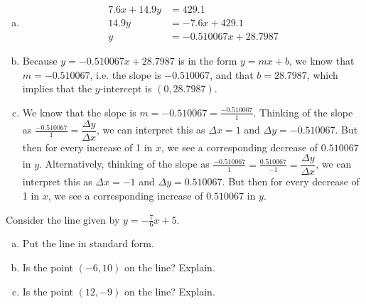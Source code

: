 \documentclass[11pt,letterpaper]{article}
\begin{document}
\sol
\begin{enumerate}[(a)]
\item 
	\[
	\begin{aligned}
	7.6x + 14.9y&= 429.1 \\[0.3cm]
	14.9y&= -7.6x + 429.1 \\[0.3cm]
	y&= -0.510067x + 28.7987
	\end{aligned}
	\] \pspace

\item Because $y= -0.510067x + 28.7987$ is in the form $y= mx + b$, we know that $m= -0.510067$, i.e. the slope is $-0.510067$, and that $b= 28.7987$, which implies that the $y$-intercept is $(0, 28.7987)$. \pspace

\item We know that the slope is $m= -0.510067= \frac{-0.510067}{1}$. Thinking of the slope as $\frac{-0.510067}{1}= \dfrac{\Delta y}{\Delta x}$, we can interpret this as $\Delta x= 1$ and $\Delta y= -0.510067$. But then for every increase of 1 in $x$, we see a corresponding decrease of $0.510067$ in $y$. Alternatively, thinking of the slope as $\frac{-0.510067}{1}= \frac{0.510067}{-1}= \dfrac{\Delta y}{\Delta x}$, we can interpret this as $\Delta x= -1$ and $\Delta y= 0.510067$. But then for every decrease of 1 in $x$, we see a corresponding increase of $0.510067$ in $y$.
\end{enumerate}



\newpage



 Consider the line given by $y= -\frac{7}{6}x + 5$.
\begin{enumerate}[(a)]
\item Put the line in standard form.
\item Is the point $(-6, 10)$ on the line? Explain.
\item Is the point $(12, -9)$ on the line? Explain. 
\end{enumerate} \pspace
\end{document}
